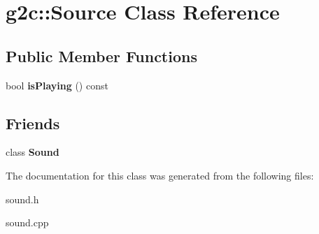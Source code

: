 \hypertarget{classg2c_1_1_source}{
\section{g2c::Source Class Reference}
\label{classg2c_1_1_source}
}
\subsection*{Public Member Functions}
\begin{DoxyCompactItemize}
\item 
\hypertarget{classg2c_1_1_source_a3ba33326a68c95f48255eda5e3ad02cc}{
bool {\bfseries isPlaying} () const }
\label{classg2c_1_1_source_a3ba33326a68c95f48255eda5e3ad02cc}

\end{DoxyCompactItemize}
\subsection*{Friends}
\begin{DoxyCompactItemize}
\item 
\hypertarget{classg2c_1_1_source_a50914f77c7cf4fb97616c898c5291f4b}{
class {\bfseries Sound}}
\label{classg2c_1_1_source_a50914f77c7cf4fb97616c898c5291f4b}

\end{DoxyCompactItemize}


The documentation for this class was generated from the following files:\begin{DoxyCompactItemize}
\item 
sound.h\item 
sound.cpp\end{DoxyCompactItemize}
